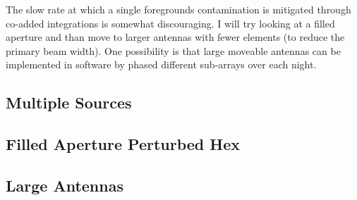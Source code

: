 \documentclass[a4paper,fleqn,usenatbib]{mnras}
\begin{document}
The slow rate at which a single foregrounds contamination is mitigated through co-added integrations is somewhat discouraging. I will try looking at a filled aperture and than move to larger antennas with fewer elements (to reduce the primary beam width). One possibility is that large moveable antennas can be implemented in software by phased different sub-arrays over each night. 

\subsection{Multiple Sources}
\subsection{Filled Aperture Perturbed Hex}
\subsection{Large Antennas}












\bsp	%
\label{lastpage}
\end{document}
